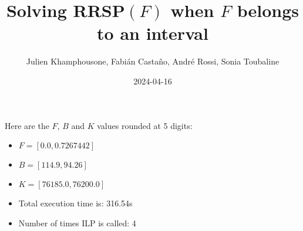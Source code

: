 \documentclass{article}
\begin{document}
     \title{Solving RRSP$(F)$ when $F$ belongs to an interval}
     \author{Julien Khamphousone, Fabi\'an Casta\~no, Andr\'e Rossi, Sonia Toubaline}
     \date{2024-04-16}
     \maketitle
     \def\F{{0.0,0.0072674,0.0079942}}
\def\gF{{761.85,762.6850291,76200.6850291}}

    Here are the $F$, $B$ and $K$ values rounded at 5 digits:

\begin{itemize}
	\item  $F = [0.0,0.7267442]$
 \item $B = [114.9,94.26]$
 \item  $K = [76185.0,76200.0]$\item Total execution time is: 316.54s\item Number of times ILP is called: 4\end{itemize}
\end{document}
